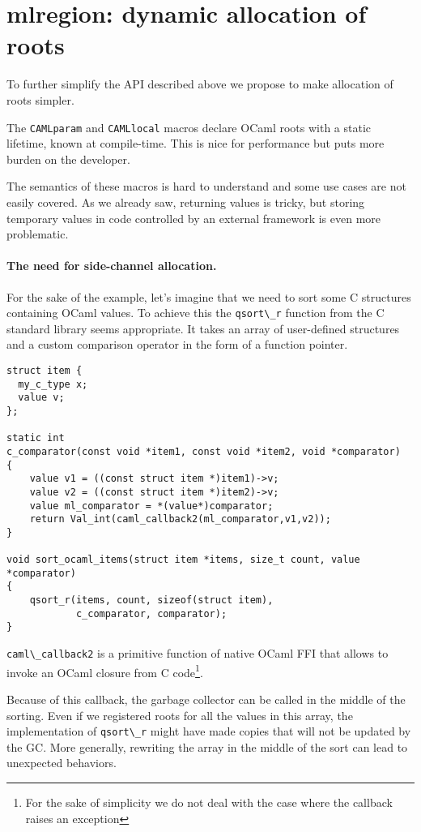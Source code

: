 \documentclass[a4paper]{easychair}
\newcommand{\cpp}[1]{\lstinline[style=C++]{#1}}
\begin{document}
\section{mlregion: dynamic allocation of roots}

To further simplify the API described above we propose to make
allocation of roots simpler.

The \cpp{CAMLparam} and \cpp{CAMLlocal} macros declare OCaml roots
with a static lifetime, known at compile-time. This is nice for
performance but puts more burden on the developer.

The semantics of these macros is hard to understand and some use cases
are not easily covered. As we already saw, returning values is tricky,
but storing temporary values in code controlled by an external framework
is even more problematic.

\paragraph{The need for side-channel allocation.}

For the sake of the example, let's imagine that we need to sort some C
structures containing OCaml values. To achieve this the
\cpp{qsort\_r} function from the C standard library seems appropriate. It
takes an array of user-defined structures and a custom comparison
operator in the form of a function pointer.
%
\begin{lstlisting}[style=C++]
struct item {
  my_c_type x;
  value v;
};

static int
c_comparator(const void *item1, const void *item2, void *comparator)
{
    value v1 = ((const struct item *)item1)->v;
    value v2 = ((const struct item *)item2)->v;
    value ml_comparator = *(value*)comparator;
    return Val_int(caml_callback2(ml_comparator,v1,v2));
}

void sort_ocaml_items(struct item *items, size_t count, value *comparator)
{
    qsort_r(items, count, sizeof(struct item),
            c_comparator, comparator);
}
\end{lstlisting}

\cpp{caml\_callback2} is a primitive function of native OCaml FFI
that allows to invoke an OCaml closure from C code\footnote{For the sake of
simplicity we do not deal with the case where the callback raises an
exception}.

Because of this callback, the garbage collector can be called in the
middle of the sorting. Even if we registered roots for all the values
in this array, the implementation of \cpp{qsort\_r} might have made
copies that will not be updated by the GC. More generally, rewriting
the array in the middle of the sort can lead to unexpected behaviors.
\end{document}

